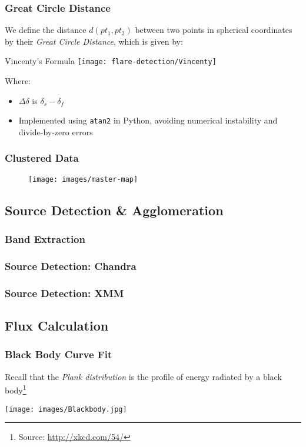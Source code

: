 \begin{frame}
\frametitle{Great Circle Distance}
	We define the distance $d(pt_1,pt_2)$ between two points in spherical coordinates by their \emph{Great Circle Distance}, which is given by:
\begin{block}{Vincenty's Formula}
\texttt{[image: flare-detection/Vincenty]}
\end{block}
Where:
\begin{itemize}
\item $\Delta \delta$ is $\delta_s-\delta_f$
\item Implemented using \texttt{atan2} in Python, avoiding numerical instability and divide-by-zero errors
\end{itemize}
\end{frame}
\begin{frame}
\frametitle{Clustered Data}
\begin{figure}[h,b]
\centering
\texttt{[image: images/master-map]}
\end{figure}
\end{frame}
\subsection{Source Detection \& Agglomeration}
\begin{frame}
\frametitle{Band Extraction}
\end{frame}
\begin{frame}
\frametitle{Source Detection: Chandra}
\end{frame}
\begin{frame}
\frametitle{Source Detection: XMM}
\end{frame}
\subsection{Flux Calculation}
\begin{frame}
\frametitle{Black Body Curve Fit}
Recall that the \emph{Plank distribution} is the profile of energy radiated by a black body\footnote{Source: \url{http://xkcd.com/54/}}
\begin{center}
\texttt{[image: images/Blackbody.jpg]}
\end{center}
\end{frame}
